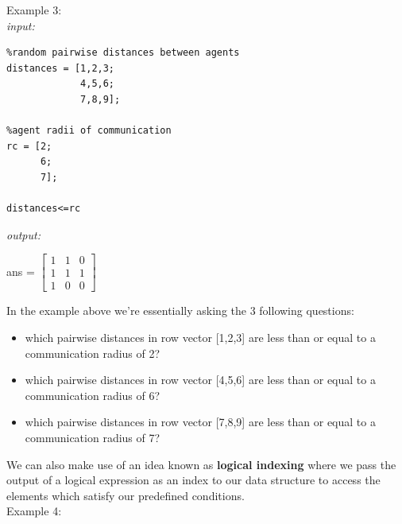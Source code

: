 \documentclass[../MATLAB_Primer.tex]{subfiles}
\begin{document}
Example 3:\\

\textit{input:}
\begin{lstlisting}
%random pairwise distances between agents 
distances = [1,2,3; 
             4,5,6; 
             7,8,9];

%agent radii of communication
rc = [2;
      6;
      7];

distances<=rc
\end{lstlisting}
\textit{output:}
\begin{center}
    ans = 
    $\begin{bmatrix}
    1 & 1 & 0\\
    1 & 1 & 1\\
    1 & 0 & 0
    \end{bmatrix}$
\end{center}

\begin{center}
     
\end{center}

In the example above we're essentially asking the 3 following questions:
\begin{itemize}
    \item which pairwise distances in row vector [1,2,3] are less than or equal to a communication radius of 2?
    \item which pairwise distances in row vector [4,5,6] are less than or equal to a communication radius of 6?
    \item which pairwise distances in row vector [7,8,9] are less than or equal to a communication radius of 7?
\end{itemize}

\begin{center}
     
\end{center}

We can also make use of an idea known as \textbf{logical indexing} where we pass the output of a logical expression as an index to our data structure to access the elements which satisfy our predefined conditions.\\ 

Example 4:\\
\end{document}

